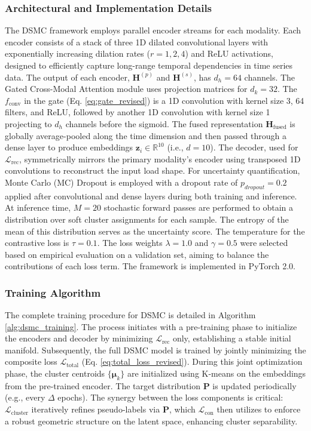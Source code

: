 \documentclass[journal]{IEEEtran}
\begin{document}
\subsubsection{Architectural and Implementation Details}
The DSMC framework employs parallel encoder streams for each modality. Each encoder consists of a stack of three 1D dilated convolutional layers with exponentially increasing dilation rates ($r=1, 2, 4$) and ReLU activations, designed to efficiently capture long-range temporal dependencies in time series data. The output of each encoder, $\mathbf{H}^{(p)}$ and $\mathbf{H}^{(s)}$, has $d_h=64$ channels. The Gated Cross-Modal Attention module uses projection matrices for $d_k=32$. The $f_{\text{conv}}$ in the gate (Eq. \ref{eq:gate_revised}) is a 1D convolution with kernel size 3, 64 filters, and ReLU, followed by another 1D convolution with kernel size 1 projecting to $d_h$ channels before the sigmoid. The fused representation $\mathbf{H}_{\text{fused}}$ is globally average-pooled along the time dimension and then passed through a dense layer to produce embeddings $\mathbf{z}_i \in \mathbb{R}^{10}$ (i.e., $d=10$). The decoder, used for $\mathcal{L}_{\text{rec}}$, symmetrically mirrors the primary modality's encoder using transposed 1D convolutions to reconstruct the input load shape.
For uncertainty quantification, Monte Carlo (MC) Dropout \cite{mc_dropout_gal} is employed with a dropout rate of $p_{dropout}=0.2$ applied after convolutional and dense layers during both training and inference. At inference time, $M=20$ stochastic forward passes are performed to obtain a distribution over soft cluster assignments for each sample. The entropy of the mean of this distribution serves as the uncertainty score. The temperature for the contrastive loss is $\tau=0.1$. The loss weights $\lambda=1.0$ and $\gamma=0.5$ were selected based on empirical evaluation on a validation set, aiming to balance the contributions of each loss term. The framework is implemented in PyTorch 2.0.

\subsubsection{Training Algorithm}
The complete training procedure for DSMC is detailed in Algorithm \ref{alg:dsmc_training}. The process initiates with a pre-training phase to initialize the encoders and decoder by minimizing $\mathcal{L}_{\text{rec}}$ only, establishing a stable initial manifold. Subsequently, the full DSMC model is trained by jointly minimizing the composite loss $\mathcal{L}_{\text{total}}$ (Eq. \ref{eq:total_loss_revised}). During this joint optimization phase, the cluster centroids $\{\boldsymbol{\mu}_k\}$ are initialized using K-means on the embeddings from the pre-trained encoder. The target distribution $\mathbf{P}$ is updated periodically (e.g., every $\Delta$ epochs). The synergy between the loss components is critical: $\mathcal{L}_{\text{cluster}}$ iteratively refines pseudo-labels via $\mathbf{P}$, which $\mathcal{L}_{\text{con}}$ then utilizes to enforce a robust geometric structure on the latent space, enhancing cluster separability.
\end{document}
